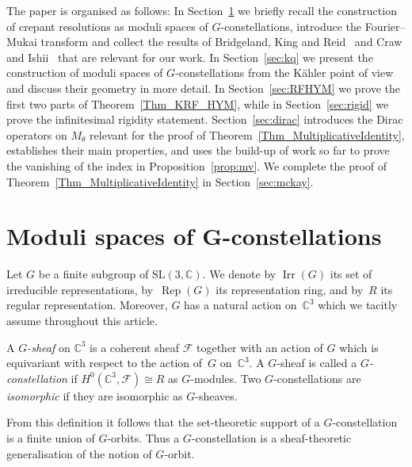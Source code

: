 \documentclass[10pt,a4paper]{amsart}
\numberwithin{equation}{section}
\newcommand{\sF}{\mathscr{F}}
\newcommand{\C}{{\mathbb C}}
\newcommand{\SL}{\mathrm{SL}}
\newcommand{\Irr}{\operatorname{Irr}}
\newcommand{\iso}{\cong}
\newcommand{\Rep}{\operatorname{Rep}}
\begin{document}
The paper is organised as follows:
In Section~\ref{Sec_ModuliSpacesOfGConstellations} we brief\/ly recall the construction of crepant resolutions as moduli spaces of $G$-constellations, introduce the Fourier--Mukai transform and collect the results of Bridgeland, King and Reid~\cite{Bridgeland2001} and Craw and Ishii~\cite{Craw2004} that are
relevant for our work.
In Section~\ref{sec:kq} we present the construction of moduli spaces of $G$-constellations from the K\"ahler point of view and discuss their geometry in more detail.
In Section~\ref{sec:RFHYM} we prove the f\/irst two parts of Theorem~\ref{Thm_KRF_HYM}, while in Section~\ref{sec:rigid} we prove the inf\/initesimal rigidity statement.
Section~\ref{sec:dirac} introduces the Dirac operators on $M_\theta$ relevant for the proof of Theorem~\ref{Thm_MultiplicativeIdentity}, establishes their main properties, and uses the build-up of work so far to prove the vanishing of the index in Proposition~\ref{prop:mv}.
We complete the proof of Theorem~\ref{Thm_MultiplicativeIdentity} in Section~\ref{sec:mckay}.

\section[Moduli spaces of $G$-constellations]{Moduli spaces of $\boldsymbol{G}$-constellations}
\label{Sec_ModuliSpacesOfGConstellations}

Let $G$ be a f\/inite subgroup of $\SL(3,\C)$.  We denote by $\Irr(G)$
its set of irreducible representations, by~$\Rep(G)$ its
representation ring, and by~$R$ its regular representation.  Moreover,
$G$ has a natural action on~$\C^3$ which we tacitly assume
throughout this article.

\begin{Definition}
  \label{Def_GConstellation}
  A \emph{$G$-sheaf} on $\C^3$ is a coherent sheaf $\sF$ together
  with an action of $G$ which is equivariant with respect to the
  action of~$G$ on~$\C^3$.  A $G$-sheaf is called a
  \emph{$G$-constellation} if $H^{0}(\C^3, \sF) \iso R$ as
  $G$-modules.  Two $G$-constellations are \emph{isomorphic} if they
  are isomorphic as $G$-sheaves.
\end{Definition}

From this def\/inition it follows that the set-theoretic support of a $G$-constellation is a f\/inite union of $G$-orbits.
Thus a $G$-constellation is a sheaf-theoretic generalisation of the notion of $G$-orbit.
\end{document}
